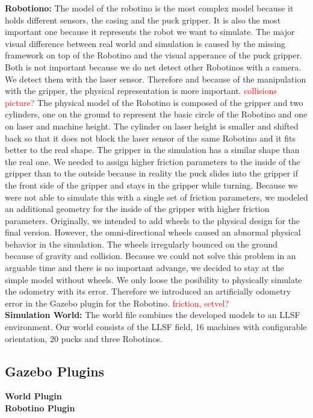 \textbf{Robotiono:} The model of the robotino is the most complex model because it holds different sensors, the casing and the puck gripper. It is also the most important one because it represents the robot we want to simulate. The major visual difference between real world and simulation is caused by the missing framework on top of the Robotino and the visual apperance of the puck gripper. Both is not important because we do net detect other Robotinos with a camera. We detect them with the laser sensor. Therefore and because of the manipulation with the gripper, the physical representation is more important. \textcolor{red}{collisions picture?} The physical model of the Robotino is composed of the gripper and two cylinders, one on the ground to represent the basic circle of the Robotino and one on laser and machine height. The cylinder on laser height is smaller and shifted back so that it does not block the laser sensor of the same Robotino and it fits better to the real shape. The gripper in the simulation has a similar shape than the real one. We needed to assign higher friction parameters to the inside of the gripper than to the outside because in reality the puck slides into the gripper if the front side of the gripper and stays in the gripper while turning. Because we were not able to simulate this with a single set of friction parameters, we modeled an additional geometry for the inside of the gripper with higher friction parameters. Originally, we intended to add wheels to the physical design for the final version. However, the omni-directional wheels caused an abnormal physical behavior in the simulation. The wheels irregularly bounced on the ground because of gravity and collision. Because we could not solve this problem in an arguable time and there is no important advange, we decided to stay at the simple model without wheels. We only loose the posibility to physically simulate the odometry with its error. Therefore we introduced an artificially odometry error in the Gazebo plugin for the Robotino. \textcolor{red}{friction, setvel?}\\
\textbf{Simulation World:} The world file combines the developed models to an LLSF environment. Our world consists of the LLSF field, 16 machines with configurable orientation, 20 pucks and three Robotinos.\\


\subsection{Gazebo Plugins}
\textbf{World Plugin}
\\
\textbf{Robotino Plugin}


